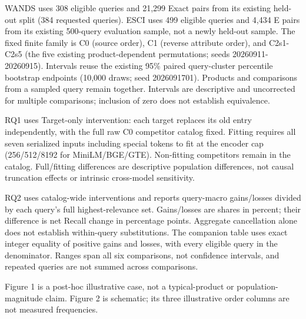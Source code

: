 WANDS uses 308 eligible queries and 21,299 Exact pairs from its existing held-out split (384 requested queries). ESCI uses 499 eligible queries and 4,434 E pairs from its existing 500-query evaluation sample, not a newly held-out sample. The fixed finite family is C0 (source order), C1 (reverse attribute order), and C2s1-C2s5 (the five existing product-dependent permutations; seeds 20260911-20260915). Intervals reuse the existing 95\% paired query-cluster percentile bootstrap endpoints (10,000 draws; seed 2026091701). Products and comparisons from a sampled query remain together. Intervals are descriptive and uncorrected for multiple comparisons; inclusion of zero does not establish equivalence.

RQ1 uses Target-only intervention: each target replaces its old entry independently, with the full raw C0 competitor catalog fixed. Fitting requires all seven serialized inputs including special tokens to fit at the encoder cap (256/512/8192 for MiniLM/BGE/GTE). Non-fitting competitors remain in the catalog. Full/fitting differences are descriptive population differences, not causal truncation effects or intrinsic cross-model sensitivity.

RQ2 uses catalog-wide interventions and reports query-macro gains/losses divided by each query's full highest-relevance set. Gains/losses are shares in percent; their difference is net Recall change in percentage points. Aggregate cancellation alone does not establish within-query substitutions. The companion table uses exact integer equality of positive gains and losses, with every eligible query in the denominator. Ranges span all six comparisons, not confidence intervals, and repeated queries are not summed across comparisons.

Figure 1 is a post-hoc illustrative case, not a typical-product or population-magnitude claim. Figure 2 is schematic; its three illustrative order columns are not measured frequencies.
